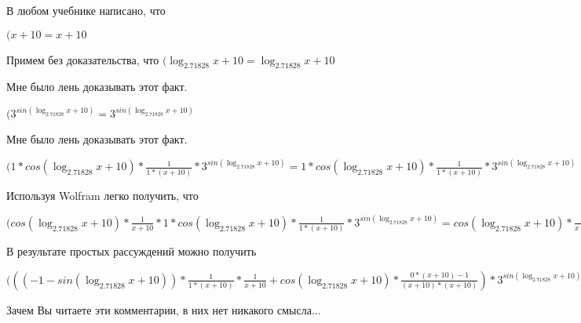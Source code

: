 \documentclass[12pt,a4paper,fleqn]{article}
\theoremstyle{definition}
\begin{document}
В любом учебнике написано, что

$( x  +  10  =  x  +  10 $

Примем без доказательства, что
$(\log_{ 2.71828 }{ x  +  10 } = \log_{ 2.71828 }{ x  +  10 }$

Мне было лень доказывать этот факт.

$({ 3 }^{sin(\log_{ 2.71828 }{ x  +  10 })} = { 3 }^{sin(\log_{ 2.71828 }{ x  +  10 })}$

Мне было лень доказывать этот факт.

$( 1  * cos(\log_{ 2.71828 }{ x  +  10 }) * \frac{ 1 }{ 1  * ( x  +  10 )}
 * { 3 }^{sin(\log_{ 2.71828 }{ x  +  10 })} =  1  * cos(\log_{ 2.71828 }{ x  +  10 }) * \frac{ 1 }{ 1  * ( x  +  10 )}
 * { 3 }^{sin(\log_{ 2.71828 }{ x  +  10 })}$

Используя Wolfram легко получить, что

$(cos(\log_{ 2.71828 }{ x  +  10 }) * \frac{ 1 }{ x  +  10 }
 *  1  * cos(\log_{ 2.71828 }{ x  +  10 }) * \frac{ 1 }{ 1  * ( x  +  10 )}
 * { 3 }^{sin(\log_{ 2.71828 }{ x  +  10 })} = cos(\log_{ 2.71828 }{ x  +  10 }) * \frac{ 1 }{ x  +  10 }
 *  1  * cos(\log_{ 2.71828 }{ x  +  10 }) * \frac{ 1 }{ 1  * ( x  +  10 )}
 * { 3 }^{sin(\log_{ 2.71828 }{ x  +  10 })}$

В результате простых рассуждений можно получить

$((( -1  - sin(\log_{ 2.71828 }{ x  +  10 })) * \frac{ 1 }{ 1  * ( x  +  10 )}
 * \frac{ 1 }{ x  +  10 }
 + cos(\log_{ 2.71828 }{ x  +  10 }) * \frac{ 0  * ( x  +  10 ) -  1 }{( x  +  10 ) * ( x  +  10 )}
) * { 3 }^{sin(\log_{ 2.71828 }{ x  +  10 })} + cos(\log_{ 2.71828 }{ x  +  10 }) * \frac{ 1 }{ x  +  10 }
 *  1  * cos(\log_{ 2.71828 }{ x  +  10 }) * \frac{ 1 }{ 1  * ( x  +  10 )}
 * { 3 }^{sin(\log_{ 2.71828 }{ x  +  10 })} = (( -1  - sin(\log_{ 2.71828 }{ x  +  10 })) * \frac{ 1 }{ 1  * ( x  +  10 )}
 * \frac{ 1 }{ x  +  10 }
 + cos(\log_{ 2.71828 }{ x  +  10 }) * \frac{ 0  * ( x  +  10 ) -  1 }{( x  +  10 ) * ( x  +  10 )}
) * { 3 }^{sin(\log_{ 2.71828 }{ x  +  10 })} + cos(\log_{ 2.71828 }{ x  +  10 }) * \frac{ 1 }{ x  +  10 }
 *  1  * cos(\log_{ 2.71828 }{ x  +  10 }) * \frac{ 1 }{ 1  * ( x  +  10 )}
 * { 3 }^{sin(\log_{ 2.71828 }{ x  +  10 })}$

Зачем Вы читаете эти комментарии, в них нет никакого смысла...
\end{document}
